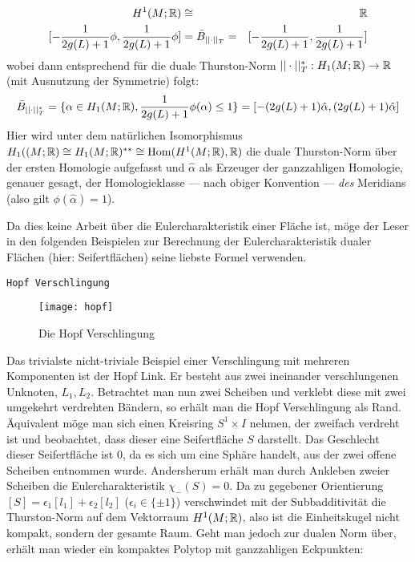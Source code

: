         \begin{eqnarray*}
            H^1(M;\mathbb{R}) &\cong & \mathbb{R} \\
            {[- \frac{1}{2g(L)+1} \phi,\frac 1 {2g(L)+1} \phi]} & = \bar B_{||\cdot||_T}=& {[- \frac 1 {2g(L)+1}, \frac 1 {2g(L)+1}]}
        \end{eqnarray*}
        wobei dann entsprechend für die duale Thurston-Norm $||\cdot||_T^* : H_1(M;\mathbb{R})\to \mathbb{R}$ (mit Ausnutzung der Symmetrie) folgt:
        \[
            \bar B_{||\cdot||_T^*} = \{\alpha \in H_1(M;\mathbb{R}), \frac{1}{2g(L)+1}\phi (\alpha)\leq 1\} = {[-(2g(L)+1)\hat \alpha, (2g(L)+1) \hat \alpha]}
        \]
        Hier wird unter dem natürlichen Isomorphismus $H_1((M;\mathbb{R}) \cong H_1(M;\mathbb{R})^{**} \cong \operatorname{Hom}(H^1(M;\mathbb{R}),\mathbb{R})$ die duale Thurston-Norm über der ersten Homologie aufgefasst und $\hat \alpha$ als Erzeuger der ganzzahligen Homologie, genauer gesagt, der Homologieklasse --- nach obiger Konvention --- \emph{des} Meridians (also gilt $\phi(\hat \alpha)=1$). 
        \begin{bem}
            Da dies keine Arbeit über die Eulercharakteristik einer Fläche ist, möge der Leser in den folgenden Beispielen zur Berechnung der Eulercharakteristik dualer Flächen (hier: Seifertflächen) seine liebste Formel verwenden.
        \end{bem}
        \texttt{Hopf Verschlingung}
        \begin{wrapfigure}{r}{0.4\textwidth}
            \centering
            \texttt{[image: hopf]}
            \caption{Die Hopf Verschlingung}
            \label{fig:hopf}
        \end{wrapfigure}
        Das trivialste nicht-triviale Beispiel einer Verschlingung mit mehreren Komponenten ist der Hopf Link. Er besteht aus zwei ineinander verschlungenen Unknoten, $L_1, L_2$. Betrachtet man nun zwei Scheiben und verklebt diese mit zwei umgekehrt verdrehten Bändern, so erhält man die Hopf Verschlingung als Rand. Äquivalent möge man sich einen Kreisring $S^1 \times I$ nehmen, der zweifach verdreht ist und beobachtet, dass dieser eine Seifertfläche $S$ darstellt. Das Geschlecht dieser Seifertfläche ist $0$, da es sich um eine Sphäre handelt, aus der zwei offene Scheiben entnommen wurde. Andersherum erhält man durch Ankleben zweier Scheiben die Eulercharakteristik $\chi_-(S)=0$. Da zu gegebener Orientierung $[S] = \epsilon_1 [l_1]+ \epsilon_2 [l_2]$ ($\epsilon_i \in \{\pm 1\}$) verschwindet mit der Subbadditivität die Thurston-Norm auf dem Vektorraum $H^1(M;\mathbb{R})$, also ist die Einheitskugel nicht kompakt, sondern der gesamte Raum. Geht man jedoch zur dualen Norm über, erhält man wieder ein kompaktes Polytop mit ganzzahligen Eckpunkten: 
